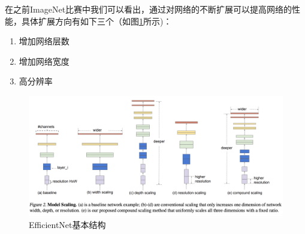 \documentclass[12pt, a4paper, oneside]{ctexart}
\numberwithin{equation}{section}  %
\begin{document}
在之前ImageNet比赛中我们可以看出，通过对网络的不断扩展可以提高网络的性能，具体扩展方向有如下三个（如图\ref{fig-EfficientNet}所示)：
\begin{enumerate}
  \item 增加网络层数
  \item 增加网络宽度
  \item 高分辨率
\end{enumerate}
\begin{figure}[htbp]
  \vspace*{-0.5cm}
  \hspace*{-2cm}
  \centering
  \includegraphics[scale=0.5]{EfficientNet.png}
  \caption{EfficientNet基本结构}
  \label{fig-EfficientNet}
\end{figure}
\end{document}
